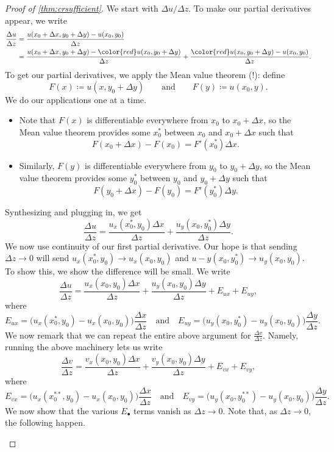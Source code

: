 \documentclass[../notes.tex]{subfiles}
\begin{document}
\begin{proof}[Proof of \autoref{thm:crsufficient}]
	We start with $\Delta u/\Delta z$. To make our partial derivatives appear, we write
	\begin{align*}
		\frac{\Delta u}{\Delta z} &= \frac{u(x_0+\Delta x,y_0+\Delta y)-u(x_0,y_0)}{\Delta z} \\
		&= \frac{u(x_0+\Delta x,y_0+\Delta y)-{\color{red}u(x_0,y_0+\Delta y)}}{\Delta z}+\frac{{\color{red}u(x_0,y_0+\Delta y)}-u(x_0,y_0)}{\Delta z}.
	\end{align*}
	To get our partial derivatives, we apply the Mean value theorem (!): define
	\[F(x)\coloneqq u(x,y_0+\Delta y)\qquad\text{and}\qquad F(y)\coloneqq u(x_0,y).\]
	We do our applications one at a time.
	\begin{itemize}
		\item Note that $F(x)$ is differentiable everywhere from $x_0$ to $x_0+\Delta x$, so the Mean value theorem provides some $x_0^*$ between $x_0$ and $x_0+\Delta x$ such that
		\[F(x_0+\Delta x)-F(x_0)=F'(x_0^*)\Delta x.\]
		\item Similarly, $F(y)$ is differentiable everywhere from $y_0$ to $y_0+\Delta y$, so the Mean value theorem provides some $y_0^*$ between $y_0$ and $y_0+\Delta y$ such that
		\[F(y_0+\Delta x)-F(y_0)=F'(y_0^*)\Delta y.\]
	\end{itemize}
	Synthesizing and plugging in, we get
	\[\frac{\Delta u}{\Delta z}=\frac{u_x(x_0^*,y_0)\Delta x}{\Delta z}+\frac{u_y(x_0,y_0^*)\Delta y}{\Delta z}.\]
	We now use continuity of our first partial derivative. Our hope is that sending $\Delta z\to0$ will send $u_x(x_0^*,y_0)\to u_x(x_0,y_0)$ and $u-y(x_0,y_0^*)\to u_y(x_0,y_0)$. To show this, we show the difference will be small. We write
	\[\frac{\Delta u}{\Delta z}=\frac{u_x(x_0,y_0)\Delta x}{\Delta z}+\frac{u_y(x_0,y_0)\Delta y}{\Delta z}+E_{ux}+E_{uy},\]
	where
	\[E_{ux}=\big(u_x(x_0^*,y_0)-u_x(x_0,y_0)\big)\frac{\Delta x}{\Delta z}\quad\text{and}\quad E_{uy}=\big(u_y(x_0,y_0^*)-u_y(x_0,y_0)\big)\frac{\Delta y}{\Delta z}.\]
	We now remark that we can repeat the entire above argument for $\frac{\Delta v}{\Delta z}$. Namely, running the above machinery lets us write
	\[\frac{\Delta v}{\Delta z}=\frac{v_x(x_0,y_0)\Delta x}{\Delta z}+\frac{v_y(x_0,y_0)\Delta y}{\Delta z}+E_{vx}+E_{vy},\]
	where
	\[E_{vx}=\big(u_x(x_0^{**},y_0)-u_x(x_0,y_0)\big)\frac{\Delta x}{\Delta z}\quad\text{and}\quad E_{vy}=\big(u_y(x_0,y_0^{**})-u_y(x_0,y_0)\big)\frac{\Delta y}{\Delta z}.\]
	We now show that the various $E_\bullet$ terms vanish as $\Delta z\to0$. Note that, as $\Delta z\to0$, the following happen.
	\begin{itemize}

\end{itemize}
\end{proof}
\end{document}
